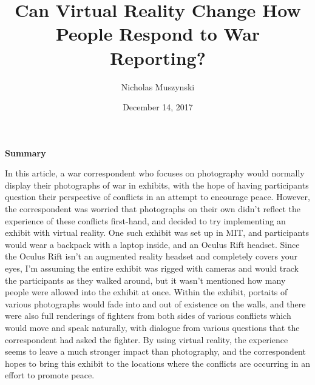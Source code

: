 \documentclass{article}
\begin{document}
\title{Can Virtual Reality Change How People Respond to War Reporting?}
\author{Nicholas Muszynski}
\date{December 14, 2017}

\maketitle

\textbf{Summary}
\newline

In this article, a war correspondent who focuses on photography would normally display their photographs of war in exhibits, with the hope of having participants question their perspective of conflicts in an attempt to encourage peace. However, the correspondent was worried that photographs on their own didn't reflect the experience of these conflicts first-hand, and decided to try implementing an exhibit with virtual reality. One such exhibit was set up in MIT, and participants would wear a backpack with a laptop inside, and an Oculus Rift headset. Since the Oculus Rift isn't an augmented reality headset and completely covers your eyes, I'm assuming the entire exhibit was rigged with cameras and would track the participants as they walked around, but it wasn't mentioned how many people were allowed into the exhibit at once. Within the exhibit, portaits of various photographs would fade into and out of existence on the walls, and there were also full renderings of fighters from both sides of various conflicts which would move and speak naturally, with dialogue from various questions that the correspondent had asked the fighter. By using virtual reality, the experience seems to leave a much stronger impact than photography, and the correspondent hopes to bring this exhibit to the locations where the conflicts are occurring in an effort to promote peace.

\nocite{warReportingCite}



\end{document}
